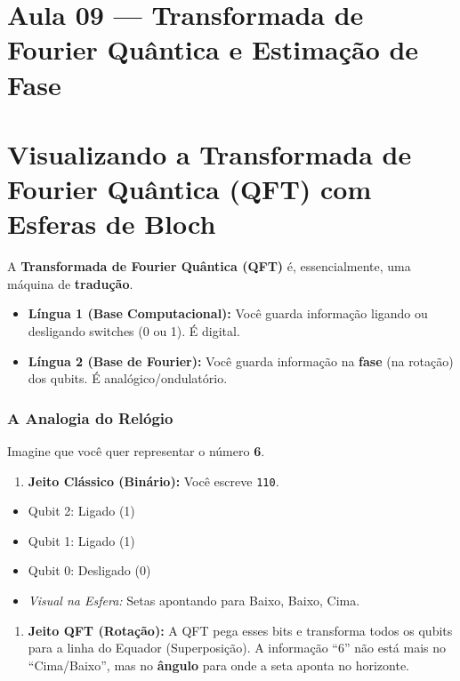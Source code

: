 \documentclass[
  brazilian,
]{report}
\providecommand{\tightlist}{%
  \setlength{\itemsep}{0pt}\setlength{\parskip}{0pt}}
\begin{document}
\chapter{Aula 09 --- Transformada de Fourier Quântica e Estimação de
Fase}\label{aula-09-transformada-de-fourier-quuxe2ntica-e-estimauxe7uxe3o-de-fase}

\chapter{Visualizando a Transformada de Fourier Quântica (QFT) com
Esferas de
Bloch}\label{visualizando-a-transformada-de-fourier-quuxe2ntica-qft-com-esferas-de-bloch}

A \textbf{Transformada de Fourier Quântica (QFT)} é, essencialmente, uma
máquina de \textbf{tradução}.

\begin{itemize}
\tightlist
\item
  \textbf{Língua 1 (Base Computacional):} Você guarda informação ligando
  ou desligando switches (0 ou 1). É digital.
\item
  \textbf{Língua 2 (Base de Fourier):} Você guarda informação na
  \textbf{fase} (na rotação) dos qubits. É analógico/ondulatório.
\end{itemize}

\subsection{A Analogia do Relógio}\label{a-analogia-do-reluxf3gio}

Imagine que você quer representar o número \textbf{6}.

\begin{enumerate}
\def\labelenumi{\arabic{enumi}.}
\tightlist
\item
  \textbf{Jeito Clássico (Binário):} Você escreve \texttt{110}.
\end{enumerate}

\begin{itemize}
\tightlist
\item
  Qubit 2: Ligado (1)
\item
  Qubit 1: Ligado (1)
\item
  Qubit 0: Desligado (0)
\item
  \emph{Visual na Esfera:} Setas apontando para Baixo, Baixo, Cima.
\end{itemize}

\begin{enumerate}
\def\labelenumi{\arabic{enumi}.}
\setcounter{enumi}{1}
\tightlist
\item
  \textbf{Jeito QFT (Rotação):} A QFT pega esses bits e transforma todos
  os qubits para a linha do Equador (Superposição). A informação ``6''
  não está mais no ``Cima/Baixo'', mas no \textbf{ângulo} para onde a
  seta aponta no horizonte.
\end{enumerate}
\end{document}
